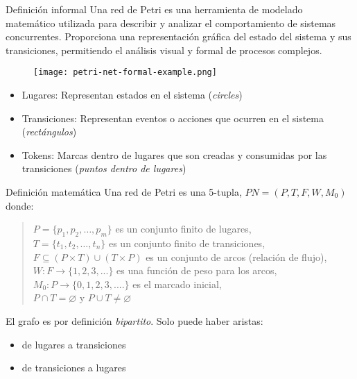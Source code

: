 \documentclass{beamer}
\begin{document}
\begin{frame}{Definición informal}
  Una red de Petri es una herramienta de modelado matemático
  utilizada para describir y analizar el comportamiento de sistemas concurrentes.
  Proporciona una representación gráfica del estado del sistema y sus transiciones,
  permitiendo el análisis visual y formal de procesos complejos.

  \begin{figure}[!htb]
    \centering
    \texttt{[image: petri-net-formal-example.png]}
  \end{figure}

  \scriptsize
  \begin{itemize}
    \item Lugares: Representan estados en el sistema (\emph{circles})
    \item Transiciones: Representan eventos o acciones que ocurren en el sistema (\emph{rectángulos})
    \item Tokens: Marcas dentro de lugares que son creadas
          y consumidas por las transiciones (\emph{puntos dentro de lugares})
  \end{itemize}

  \vfill
\end{frame}

\begin{frame}{Definición matemática}
  Una red de Petri es una 5-tupla, $ PN = (P, T, F, W, M_{0}) $ donde:

  \begin{quote}
    $ P = \{ p_1, p_2, \dots, p_m \} $ es un conjunto finito de lugares,\\
    $ T = \{ t_1, t_2, \dots, t_n \} $ es un conjunto finito de transiciones,\\
    $ F \subseteq (P \times T) \cup (T \times P) $ es un conjunto de arcos (relación de flujo),\\
    $ W: F \rightarrow \{1, 2, 3, ... \} $ es una función de peso para los arcos,\\
    $ M_{0}: P \rightarrow \{0, 1, 2, 3, .... \} $ es el marcado inicial,\\
    $ P \cap T = \varnothing $ y $ P \cup T \neq \varnothing $
  \end{quote}
  
  \vfill

  El grafo es por definición \emph{bipartito}.
  Solo puede haber aristas:
  \begin{itemize}
    \item de lugares a transiciones
    \item de transiciones a lugares
  \end{itemize}

\end{frame}
\end{document}
